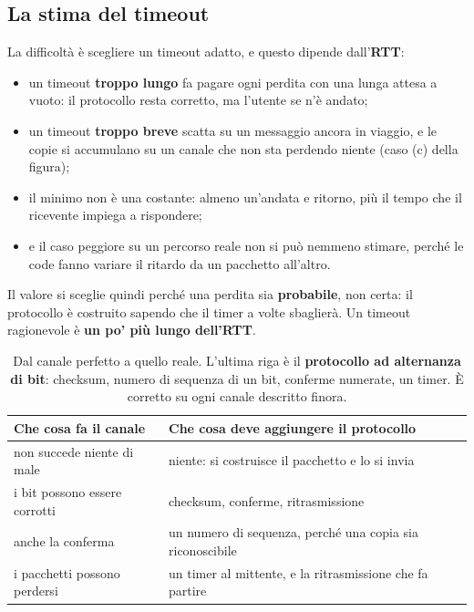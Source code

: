 \subsection{La stima del timeout}

La difficoltà è scegliere un timeout adatto, e questo dipende dall'\textbf{RTT}:

\begin{itemize}
    \item un timeout \textbf{troppo lungo} fa pagare ogni perdita con una lunga attesa a vuoto: il protocollo resta
          corretto, ma l'utente se n'è andato;
    \item un timeout \textbf{troppo breve} scatta su un messaggio ancora in viaggio, e le copie si accumulano su un canale
          che non sta perdendo niente (caso (c) della figura);
    \item il minimo non è una costante: almeno un'andata e ritorno, più il tempo che il ricevente impiega a rispondere;
    \item e il caso peggiore su un percorso reale non si può nemmeno stimare, perché le code fanno variare il ritardo da un
          pacchetto all'altro.
\end{itemize}

Il valore si sceglie quindi perché una perdita sia \textbf{probabile}, non certa: il protocollo è costruito sapendo che il
timer a volte sbaglierà. Un timeout ragionevole è \textbf{un po' più lungo dell'RTT}.


\begin{table}[H]
\centering
\begin{tabular}{l l}
\toprule
\textbf{Che cosa fa il canale} & \textbf{Che cosa deve aggiungere il protocollo} \\
\midrule
non succede niente di male      & niente: si costruisce il pacchetto e lo si invia \\
i bit possono essere corrotti   & checksum, conferme, ritrasmissione \\
anche la conferma               & un numero di sequenza, perché una copia sia riconoscibile \\
i pacchetti possono perdersi    & un timer al mittente, e la ritrasmissione che fa partire \\
\bottomrule
\end{tabular}
\caption{Dal canale perfetto a quello reale. L'ultima riga è il \textbf{protocollo ad alternanza di bit}: checksum,
         numero di sequenza di un bit, conferme numerate, un timer. È corretto su ogni canale descritto finora.}
\end{table}

